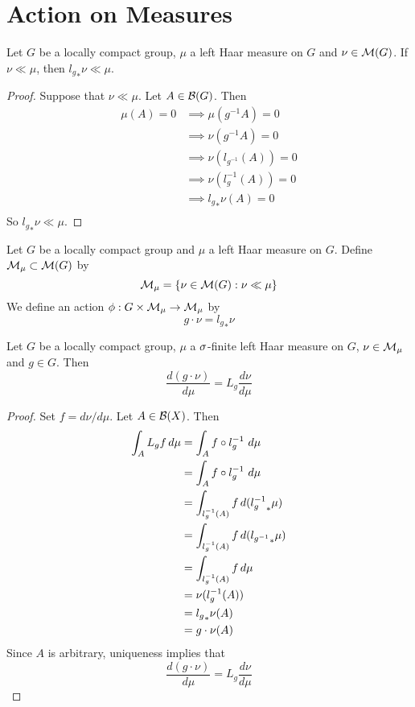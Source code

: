 \documentclass{book}
\begin{document}
	\section{Action on Measures}
	\begin{ex}
	Let $G$ be a locally compact group, $\mu$ a left Haar measure on $G$ and $\nu \in \mathcal{M}(G)$. If $\nu \ll \mu$, then ${l_g}_*\nu \ll \mu$.
	\end{ex}
	
	\begin{proof}
	Suppose that $\nu \ll \mu$. Let $A \in \mathcal{B}(G)$. Then
	\begin{align*}
	\mu(A) = 0 
	&\implies \mu(g^{-1}A) = 0 \\
	&\implies \nu(g^{-1}A) = 0 \\
	&\implies \nu(l_{g^{-1}}(A)) = 0 \\
	&\implies \nu(l_{g}^{-1}(A)) = 0 \\
	&\implies {l_g}_*\nu(A) = 0 \\
	\end{align*}
	So ${l_g}_*\nu \ll \mu$.
	\end{proof}

	\begin{defn}
	Let $G$ be a locally compact group and $\mu$ a left Haar measure on $G$. Define $\mathcal{M}_{\mu} \subset \mathcal{M}(G)$ by $$\mathcal{M}_{\mu} = \{\nu \in \mathcal{M}(G):\nu \ll \mu\}$$
	We define an action $\phi:G \times \mathcal{M}_{\mu} \rightarrow \mathcal{M}_{\mu}$ by $$g \cdot \nu = {l_g}_*\nu$$ 
	\end{defn}	
	
	\begin{ex}
	Let $G$ be a locally compact group, $\mu$ a $\sigma$-finite left Haar measure on $G$, $\nu \in \mathcal{M}_{\mu}$ and $g \in G$. Then $$ \frac{d (g \cdot \nu)}{d\mu} =  L_g \frac{d \nu}{d\mu}$$
	\end{ex}
	
	\begin{proof}
	Set $f = d \nu/ d \mu$. Let $A \in \mathcal{B}(X)$. Then 
	\begin{align*}
	\int_A L_g f \, d \mu
	&= \int_A f \circ l_{g}^{-1} \,\, d \mu \\
	&= \int_A f \circ l_g^{-1} \, \, d \mu \\
	&= \int_{l_g^{-1}(A)} f \, d ({l_g^{-1}}_* \mu) \\
	&= \int_{l_g^{-1}(A)} f \, d ({l_{g^{-1}}}_* \mu) \\
	&= \int_{l_g^{-1}(A)} f \, d \mu \\
	&= \nu(l_g^{-1}(A)) \\
	&= {l_g}_*\nu(A) \\
	&= g \cdot \nu(A)
	\end{align*}
	Since $A$ is arbitrary, uniqueness implies that 
	$$ \frac{d (g \cdot \nu)}{d\mu} =  L_g \frac{d \nu}{d\mu}$$
	\end{proof}
	
\end{document}
